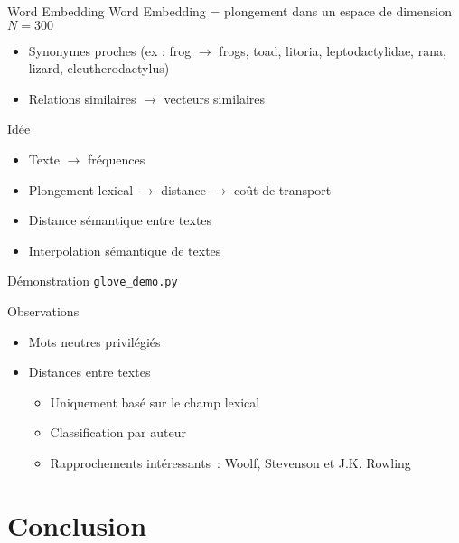 \documentclass{beamer}
\begin{document}
\begin{frame}{Word Embedding}
Word Embedding = plongement dans un espace de dimension $N = 300$
\begin{itemize}
\item Synonymes proches (ex : frog $\rightarrow$ frogs, toad, litoria, leptodactylidae, rana, lizard, eleutherodactylus)
\item Relations similaires $\rightarrow$ vecteurs similaires
\end{itemize}
\begin{figure}[h!]
\centering
{}
\hspace{1cm}
\end{figure}
\end{frame}

\begin{frame}{Idée}
\begin{itemize}
\item Texte $\rightarrow$ fréquences
\item Plongement lexical $\rightarrow$ distance $\rightarrow$ coût de transport
\item Distance sémantique entre textes
\item Interpolation sémantique de textes
\end{itemize}
\end{frame}

\begin{frame}{Démonstration}
\texttt{glove\_demo.py}
\end{frame}

\begin{frame}{Observations}
\begin{itemize}
\item Mots \og neutres \fg privilégiés
\pause
\item Distances entre textes
	\begin{itemize}
	\item Uniquement basé sur le champ lexical
	\item Classification par auteur
	\pause
	\item Rapprochements intéressants~: Woolf, Stevenson et J.K. Rowling
	\end{itemize}
\end{itemize}
\end{frame}


\section*{Conclusion}
\end{document}
